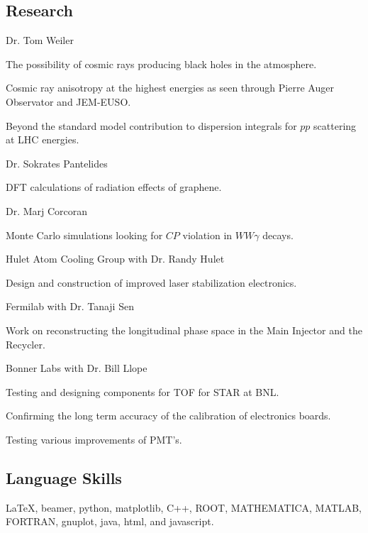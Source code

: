 \documentclass[letterpaper]{article}
\renewenvironment{itemize}{
\begin{list}{}{
\setlength{\leftmargin}{1.5em}
}
}{
\end{list}
}
\begin{document}
\subsection*{Research}
Dr. Tom Weiler
\begin{itemize}
\item The possibility of cosmic rays producing black holes in the atmosphere.
\item Cosmic ray anisotropy at the highest energies as seen through Pierre Auger Observator and JEM-EUSO.
\item Beyond the standard model contribution to dispersion integrals for $pp$ scattering at LHC energies.
\end{itemize}
Dr. Sokrates Pantelides
\begin{itemize}
\item DFT calculations of radiation effects of graphene.
\end{itemize}
Dr. Marj Corcoran
\begin{itemize}
\item Monte Carlo simulations looking for $CP$ violation in $WW\gamma$ decays.
\end{itemize}
Hulet Atom Cooling Group with Dr. Randy Hulet
\begin{itemize}
\item Design and construction of improved laser stabilization electronics.
\end{itemize}
Fermilab with Dr. Tanaji Sen
\begin{itemize}
\item Work on reconstructing the longitudinal phase space in the Main Injector and the Recycler.
\end{itemize}
Bonner Labs with Dr. Bill Llope
\begin{itemize}
\item Testing and designing components for TOF for STAR at BNL.
\item Confirming the long term accuracy of the calibration of electronics boards.
\item Testing various improvements of PMT's.
\end{itemize}
\subsection*{Language Skills}
\LaTeX, beamer, python, matplotlib, C++, ROOT, MATHEMATICA, MATLAB, FORTRAN, gnuplot, java, html, and javascript.
\end{document}

